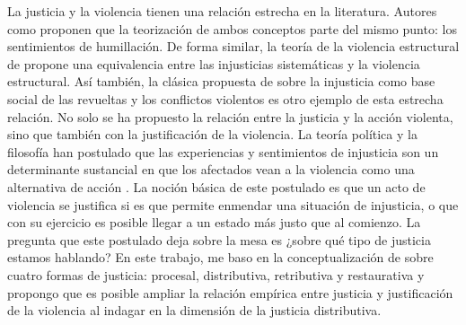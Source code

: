 \documentclass[12pt,twoside]{templates/facsothesis}
\begin{document}
La justicia y la violencia tienen una relación estrecha en la literatura. Autores como \citet{Bufacchi2007} proponen que la teorización de ambos conceptos parte del mismo punto: los sentimientos de humillación. De forma similar, la teoría de la violencia estructural de \citet{Galtung1969} propone una equivalencia entre las injusticias sistemáticas y la violencia estructural. Así también, la clásica propuesta de \citet{BarringtonMoore1978} sobre la injusticia como base social de las revueltas y los conflictos violentos es otro ejemplo de esta estrecha relación. No solo se ha propuesto la relación entre la justicia y la acción violenta, sino que también con la justificación de la violencia. La teoría política y la filosofía han postulado que las experiencias y sentimientos de injusticia son un determinante sustancial en que los afectados vean a la violencia como una alternativa de acción \citep[e.g][]{Wells1970, Bufacchi2007}. La noción básica de este postulado es que un acto de violencia se justifica si es que permite enmendar una situación de injusticia, o que con su ejercicio es posible llegar a un estado más justo que al comienzo. La pregunta que este postulado deja sobre la mesa es ¿sobre qué tipo de justicia estamos hablando? En este trabajo, me baso en la conceptualización de \citet{Sabbagh2016} sobre cuatro formas de justicia: procesal, distributiva, retributiva y restaurativa y propongo que es posible ampliar la relación empírica entre justicia y justificación de la violencia al indagar en la dimensión de la justicia distributiva.
\end{document}
